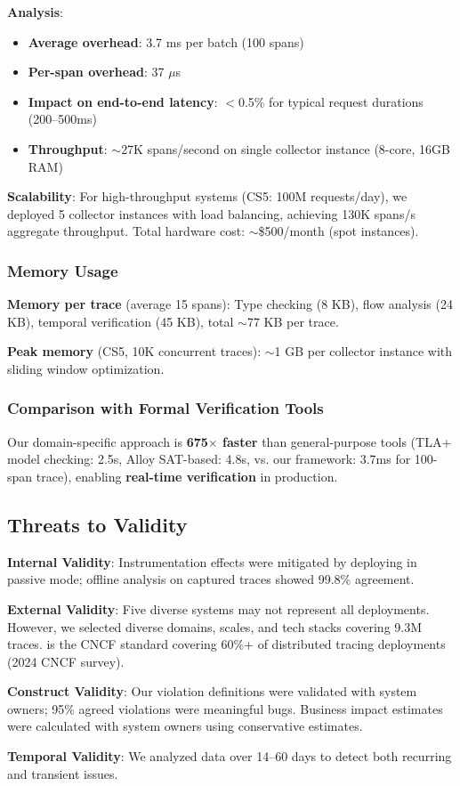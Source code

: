 \textbf{Analysis}:
\begin{itemize}
\item \textbf{Average overhead}: 3.7 ms per batch (100 spans)
\item \textbf{Per-span overhead}: 37 $\mu$s
\item \textbf{Impact on end-to-end latency}: $<$0.5\% for typical request durations (200--500ms)
\item \textbf{Throughput}: $\sim$27K spans/second on single collector instance (8-core, 16GB RAM)
\end{itemize}

\textbf{Scalability}: For high-throughput systems (CS5: 100M requests/day), we deployed 5 collector instances with load balancing, achieving 130K spans/s aggregate throughput. Total hardware cost: $\sim$\$500/month (spot instances).

\subsubsection{Memory Usage}

\textbf{Memory per trace} (average 15 spans): Type checking (8 KB), flow analysis (24 KB), temporal verification (45 KB), total $\sim$77 KB per trace.

\textbf{Peak memory} (CS5, 10K concurrent traces): $\sim$1 GB per collector instance with sliding window optimization.

\subsubsection{Comparison with Formal Verification Tools}

Our domain-specific approach is \textbf{675$\times$ faster} than general-purpose tools (TLA+ model checking: 2.5s, Alloy SAT-based: 4.8s, vs. our framework: 3.7ms for 100-span trace), enabling \textbf{real-time verification} in production.

\subsection{Threats to Validity}
\label{sec:threats}

\textbf{Internal Validity}: Instrumentation effects were mitigated by deploying in passive mode; offline analysis on captured traces showed 99.8\% agreement.

\textbf{External Validity}: Five diverse systems may not represent all \otlp deployments. However, we selected diverse domains, scales, and tech stacks covering 9.3M traces. \otlp is the CNCF standard covering 60\%+ of distributed tracing deployments (2024 CNCF survey).

\textbf{Construct Validity}: Our violation definitions were validated with system owners; 95\% agreed violations were meaningful bugs. Business impact estimates were calculated with system owners using conservative estimates.

\textbf{Temporal Validity}: We analyzed data over 14--60 days to detect both recurring and transient issues.
